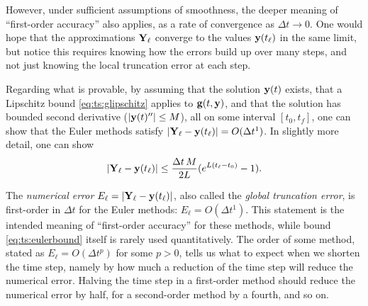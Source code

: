 However, under sufficient assumptions of smoothness, the deeper meaning of ``first-order accuracy'' also applies, as a rate of convergence as $\Delta t\to 0$.  One would hope that the approximations $\mathbf{Y}_\ell$ converge to the values $\mathbf{y}(t_\ell)$ in the same limit, but notice this requires knowing how the errors build up over many steps, and not just knowing the local truncation error at each step.

Regarding what is provable, by assuming that the solution $\mathbf{y}(t)$ exists, that a Lipschitz bound \eqref{eq:ts:glipschitz} applies to $\mathbf{g}(t,\mathbf{y})$, and that the solution has bounded second derivative ($|\mathbf{y}(t)''|\le M$), all on some interval $[t_0,t_f]$, one can show that the Euler methods satisfy $|\mathbf{Y}_\ell-\mathbf{y}(t_\ell)| = O(\Delta t^1)$.  In slightly more detail, one can show \citep{AscherPetzold1998}
\begin{equation}
|\mathbf{Y}_\ell-\mathbf{y}(t_\ell)| \le \frac{\Delta t\,M}{2L} (e^{L(t_\ell-t_0)}-1).  \label{eq:ts:eulerbound}
\end{equation}

The \emph{numerical error} $E_\ell = |\mathbf{Y}_\ell-\mathbf{y}(t_\ell)|$, also called the \emph{global truncation error}, is first-order in $\Delta t$ for the Euler methods: $E_\ell = O(\Delta t^1)$.  This statement is the intended meaning of ``first-order accuracy'' for these methods, while bound \eqref{eq:ts:eulerbound} itself is rarely used quantitatively.  The order of some method, stated as $E_\ell = O(\Delta t^p)$ for some $p>0$, tells us what to expect when we shorten the time step, namely by how much a reduction of the time step will reduce the numerical error.  Halving the time step in a first-order method should reduce the numerical error by half, for a second-order method by a fourth, and so on.

\newcommand{\RKtwoa}{RK$2$a\xspace}
\newcommand{\RKthreebs}{RK$3$bs\xspace}
\newcommand{\RKfour}{RK$4$\xspace}

